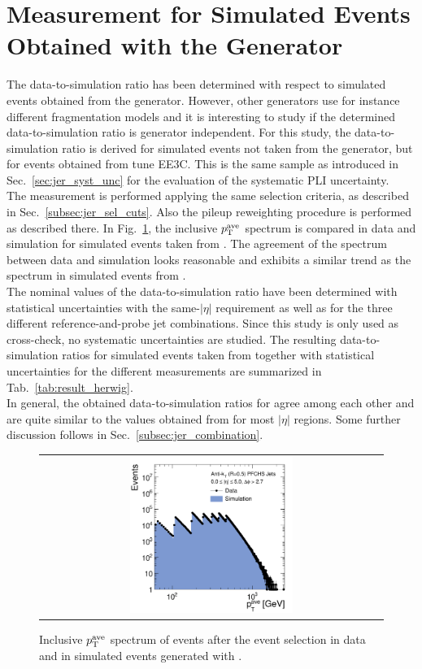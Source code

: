 \section{Measurement for Simulated Events Obtained with the \herwig Generator} 
\label{sec:jer_result_herwig}
The data-to-simulation ratio has been determined with respect to simulated events obtained from the \pythia generator. However, other generators use for instance different fragmentation models and it is interesting to study if the determined data-to-simulation ratio is generator independent. For this study, the data-to-simulation ratio is derived for simulated events not taken from the \pythia generator, but for events obtained from \herwig tune EE3C. This is the same sample as introduced in Sec.~\ref{sec:jer_syst_unc} for the evaluation of the systematic PLI uncertainty. \\
The measurement is performed applying the same selection criteria, as described in Sec.~\ref{subsec:jer_sel_cuts}. Also the pileup reweighting procedure is performed as described there. In Fig.~\ref{fig:control_plots_herwig}, the inclusive $p_{\text{T}}^\mathrm{ave}$ spectrum is compared in data and simulation for simulated events taken from \herwig. The agreement of the \ptave spectrum between data and simulation looks reasonable and exhibits a similar trend as the spectrum in simulated events from \pythia.\\
The nominal values of the data-to-simulation ratio have been determined with statistical uncertainties with the same-$|\eta|$ requirement as well as for the three different reference-and-probe jet combinations. Since this study is only used as cross-check, no systematic uncertainties are studied. The resulting data-to-simulation ratios for simulated events taken from \herwig together with statistical uncertainties for the different measurements are summarized in Tab.~\ref{tab:result_herwig}. \\
In general, the obtained data-to-simulation ratios for \herwig agree among each other and are quite similar to the values obtained from \pythia for most $|\eta|$ regions. Some further discussion follows in Sec.~\ref{subsec:jer_combination}.
\begin{figure}[!p]
  \centering
  \begin{tabular}{c}
                \includegraphics[width=0.49\textwidth]{figures/HerwigPtAve__AfterAsymmHistos.pdf}
  \end{tabular}
  \caption{Inclusive $p_{\text{T}}^\mathrm{ave}$ spectrum of events after the event selection in data and in simulated events generated with \herwig.}
  \label{fig:control_plots_herwig}
\end{figure}
